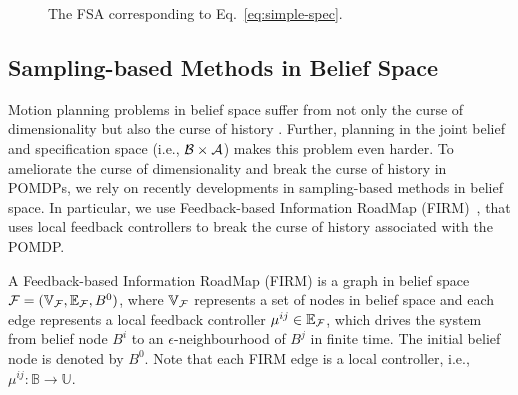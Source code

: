 \documentclass[letterpaper]{article} %
\begin{document}
\begin{figure}[h!]
\caption{The FSA corresponding to Eq.~\eqref{eq:simple-spec}.}
\label{fig:simple-spec-fsa}
\end{figure}

\let\goal\undefined
\let\obst\undefined

\subsection{Sampling-based Methods in Belief Space}
\label{sec:FIRM}

Motion planning problems in belief space suffer from not only the curse of dimensionality but also the curse of history \cite{Pineau03a}. Further, planning in the joint belief and specification space (i.e., $\mathcal{B} \times \mathcal{A}$) makes this problem even harder. To ameliorate the curse of dimensionality and break the curse of history in POMDPs, we rely on recently developments in sampling-based methods in belief space. In particular, we use Feedback-based Information RoadMap (FIRM)~\cite{Ali14-IJRR}, that uses local feedback controllers to break the curse of history associated with the POMDP. 

\begin{definition}[FIRM]
A Feedback-based Information RoadMap (FIRM) is a graph in belief space $\mathcal{F} = (\mathbb{V}_{\mathcal{F}}, \mathbb{E}_{\mathcal{F}}, B^0)$, where $\mathbb{V}_{\mathcal{F}}$ represents a set of nodes in belief space and each edge represents a local feedback controller $\mu^{ij} \in \mathbb{E}_{\mathcal{F}}$, which drives the system from belief node $B^i$ to an $\epsilon$-neighbourhood of $B^j$ in finite time. The initial belief node is denoted by $B^0$. Note that each FIRM edge is a local controller, i.e., $\mu^{ij}:\mathbb{B}\rightarrow\mathbb{U}$.
\end{definition}
\end{document}
